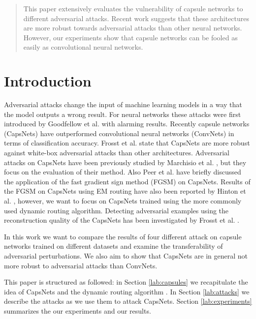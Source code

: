 \documentclass{article}
\begin{document}
\printAffiliationsAndNotice{\icmlEqualContribution} %

\begin{abstract}
	This paper extensively evaluates the vulnerability of capsule networks to different adversarial attacks. Recent work suggests that these architectures are more robust towards adversarial attacks than other neural networks. However, our experiments show that capsule networks can be fooled as easily as convolutional neural networks.
\end{abstract}

\section{Introduction}
Adversarial attacks change the input of machine learning models in a way that the model outputs a wrong result. For neural networks these attacks were first introduced by Goodfellow et al.  with alarming results. Recently capsule networks (CapsNets) \cite{capsules} have outperformed convolutional neural networks (ConvNets) in terms of classification accuracy. Frosst et al.  state that CapsNets are more robust against white-box adversarial attacks than other architectures. Adversarial attacks on CapsNets have been previously studied by Marchisio et al. , but they focus on the evaluation of their method. Also Peer et al.  have briefly discussed the application of the fast gradient sign method (FGSM) \cite{fgsm} on CapsNets. Results of the FGSM on CapsNets using EM routing have also been reported by Hinton et al. , however, we want to focus on CapsNets trained using the more commonly used dynamic routing algorithm. Detecting adversarial examples using the reconstruction quality of the CapsNets has been investigated by Frosst et al. . 

In this work we want to compare the results of four different attack on capsule networks trained on different datasets and examine the transferability of adversarial perturbations. We also aim to show that CapsNets are in general not more robust to adversarial attacks than ConvNets.

This paper is structured as followed: in Section \ref{lab:capsules} we recapitulate the idea of CapsNets and the dynamic routing algorithm \cite{capsules}. In Section \ref{lab:attacks} we describe the attacks as we use them to attack CapsNets. Section \ref{lab:experiments} summarizes the our experiments and our results.
\end{document}
